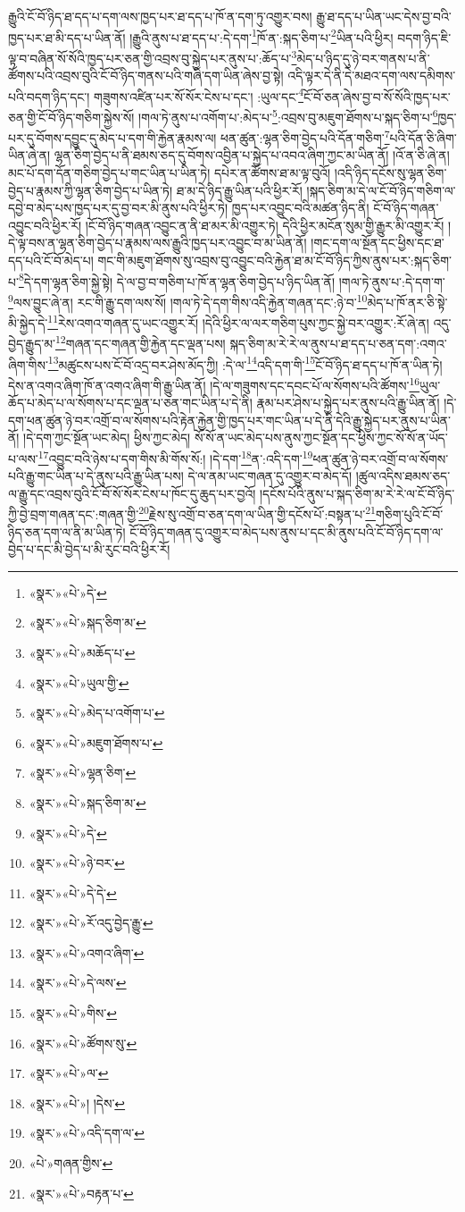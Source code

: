 རྒྱུའི་ངོ་བོ་ཉིད་ཐ་དད་པ་དག་ལས་ཁྱད་པར་ཐ་དད་པ་ཁོ་ན་དག་ཏུ་འགྱུར་བས། རྒྱུ་ཐ་དད་པ་ཡིན་ཡང་དེས་བྱ་བའི་ཁྱད་པར་ཐ་མི་དད་པ་ཡིན་ནོ། །རྒྱུའི་ནུས་པ་ཐ་དད་པ་:དེ་དག་\footnote{«སྣར་»«པེ་»དེ་}ཁོ་ན་:སྐད་ཅིག་པ་\footnote{«སྣར་»«པེ་»སྐད་ཅིག་མ་}ཡིན་པའི་ཕྱིར། བདག་ཉིད་ཇི་ལྟ་བ་བཞིན་སོ་སོའི་ཁྱད་པར་ཅན་གྱི་འབྲས་བུ་སྐྱེད་པར་ནུས་པ་:ཆོད་པ་\footnote{«སྣར་»«པེ་»མཆོད་པ་}མེད་པ་ཉིད་དུ་ཉེ་བར་གནས་པ་ནི་ཚོགས་པའི་འབྲས་བུའི་ངོ་བོ་ཉིད་གནས་པའི་གཞི་དག་ཡིན་ཞེས་བྱ་སྟེ། འདི་ལྟར་དེ་ནི་དེ་མཐའ་དག་ལས་དམིགས་པའི་བདག་ཉིད་དང་། གཟུགས་འཛིན་པར་སོ་སོར་ངེས་པ་དང་། :ཡུལ་དང་\footnote{«སྣར་»«པེ་»ཡུལ་གྱི་}ངོ་བོ་ཅན་ཞེས་བྱ་བ་སོ་སོའི་ཁྱད་པར་ཅན་གྱི་ངོ་བོ་ཉིད་གཅིག་སྐྱེས་སོ། །གལ་ཏེ་ནུས་པ་འགོག་པ་:མེད་པ་\footnote{«སྣར་»«པེ་»མེད་པ་འགོག་པ་}:འབྲས་བུ་མཇུག་ཐོགས་པ་སྐད་ཅིག་པ་\footnote{«སྣར་»«པེ་»མཇུག་ཐོགས་པ་}ཁྱད་པར་དུ་བོགས་དབྱུང་དུ་མེད་པ་དག་གི་རྐྱེན་རྣམས་ལ། ཕན་ཚུན་:ལྷན་ཅིག་བྱེད་པའི་དོན་གཅིག་\footnote{«སྣར་»«པེ་»ལྷན་ཅིག་}པའི་དོན་ཅི་ཞིག་ཡིན་ཞེ་ན། ལྷན་ཅིག་བྱེད་པ་ནི་ཐམས་ཅད་དུ་བོགས་འབྱིན་པ་སྐྱེད་པ་འབའ་ཞིག་ཀྱང་མ་ཡིན་ནོ། །འོ་ན་ཅི་ཞེ་ན། མང་པོ་དག་དོན་གཅིག་བྱེད་པ་གང་ཡིན་པ་ཡིན་ཏེ། དཔེར་ན་ཚོགས་ཐ་མ་ལྟ་བུའོ། །འདི་ཉིད་དངོས་སུ་ལྷན་ཅིག་བྱེད་པ་རྣམས་ཀྱི་ལྷན་ཅིག་བྱེད་པ་ཡིན་ཏེ། ཐ་མ་དེ་ཉིད་རྒྱུ་ཡིན་པའི་ཕྱིར་རོ། །སྐད་ཅིག་མ་དེ་ལ་ངོ་བོ་ཉིད་གཅིག་ལ་དབྱེ་བ་མེད་པས་ཁྱད་པར་དུ་བྱ་བར་མི་ནུས་པའི་ཕྱིར་ཏེ། ཁྱད་པར་འབྱུང་བའི་མཚན་ཉིད་ནི། ངོ་བོ་ཉིད་གཞན་འབྱུང་བའི་ཕྱིར་རོ། །ངོ་བོ་ཉིད་གཞན་འབྱུང་ན་ནི་ཐ་མར་མི་འགྱུར་ཏེ། དེའི་ཕྱིར་མངོན་སུམ་གྱི་རྒྱུར་མི་འགྱུར་རོ། །དེ་ལྟ་བས་ན་ལྷན་ཅིག་བྱེད་པ་རྣམས་ལས་རྒྱུའི་ཁྱད་པར་འབྱུང་བ་མ་ཡིན་ནོ། །གང་དག་ལ་སྔོན་དང་ཕྱིས་དང་ཐ་དད་པའི་ངོ་བོ་མེད་པ། གང་གི་མཇུག་ཐོགས་སུ་འབྲས་བུ་འབྱུང་བའི་རྐྱེན་ཐ་མ་ངོ་བོ་ཉིད་ཀྱིས་ནུས་པར་:སྐད་ཅིག་པ་\footnote{«སྣར་»«པེ་»སྐད་ཅིག་མ་}དེ་དག་ལྷན་ཅིག་སྐྱེ་སྟེ། དེ་ལ་བྱ་བ་གཅིག་པ་ཁོ་ན་ལྷན་ཅིག་བྱེད་པ་ཉིད་ཡིན་ནོ། །གལ་ཏེ་ནུས་པ་:དེ་དག་ག་\footnote{«སྣར་»«པེ་»དེ་}ལས་བྱུང་ཞེ་ན། རང་གི་རྒྱུ་དག་ལས་སོ། །གལ་ཏེ་དེ་དག་གིས་འདི་རྐྱེན་གཞན་དང་:ཉེ་བ་\footnote{«སྣར་»«པེ་»ཉེ་བར་}མེད་པ་ཁོ་ནར་ཅི་སྟེ་མི་སྐྱེད་དེ་\footnote{«སྣར་»«པེ་»དེ་དེ་}རེས་འགའ་གཞན་དུ་ཡང་འགྱུར་རོ། །དེའི་ཕྱིར་ལ་ལར་གཅིག་པུས་ཀྱང་སྐྱེ་བར་འགྱུར་:རོ་ཞེ་ན། འདུ་བྱེད་རྒྱུད་མ་\footnote{«སྣར་»«པེ་»རོ་འདུ་བྱེད་རྒྱུ་}གཞན་དང་གཞན་གྱི་རྐྱེན་དང་ལྡན་པས། སྐད་ཅིག་མ་རེ་རེ་ལ་ནུས་པ་ཐ་དད་པ་ཅན་དག་:འགའ་ཞིག་གིས་\footnote{«སྣར་»«པེ་»འགའ་ཞིག་}མཚུངས་པས་ངོ་བོ་འདྲ་བར་ཤེས་མོད་ཀྱི། :དེ་ལ་\footnote{«སྣར་»«པེ་»དེ་ལས་}འདི་དག་གི་\footnote{«སྣར་»«པེ་»གིས་}ངོ་བོ་ཉིད་ཐ་དད་པ་ཁོ་ན་ཡིན་ཏེ། དེས་ན་འགའ་ཞིག་ཁོ་ན་འགའ་ཞིག་གི་རྒྱུ་ཡིན་ནོ། །དེ་ལ་གཟུགས་དང་དབང་པོ་ལ་སོགས་པའི་ཚོགས་\footnote{«སྣར་»«པེ་»ཚོགས་སུ་}ཡུལ་ཆོད་པ་མེད་པ་ལ་སོགས་པ་དང་ལྡན་པ་ཅན་གང་ཡིན་པ་དེ་ནི། རྣམ་པར་ཤེས་པ་སྐྱེད་པར་ནུས་པའི་རྒྱུ་ཡིན་ནོ། །དེ་དག་ཕན་ཚུན་ཉེ་བར་འགྲོ་བ་ལ་སོགས་པའི་རྟེན་རྐྱེན་གྱི་ཁྱད་པར་གང་ཡིན་པ་དེ་ནི་དེའི་རྒྱུ་སྐྱེད་པར་ནུས་པ་ཡིན་ནོ། །དེ་དག་ཀྱང་སྔོན་ཡང་མེད། ཕྱིས་ཀྱང་མེད། སོ་སོ་ན་ཡང་མེད་པས་ནུས་ཀྱང་སྔོན་དང་ཕྱིས་ཀྱང་སོ་སོ་ན་ཡོད་པ་ལས་\footnote{«སྣར་»«པེ་»ལ་}འབྱུང་བའི་ཉེས་པ་དག་གིས་མི་གོས་སོ:། །དེ་དག་\footnote{«སྣར་»«པེ་»། །དེས་}ན་:འདི་དག་\footnote{«སྣར་»«པེ་»འདི་དག་ལ་}ཕན་ཚུན་ཉེ་བར་འགྲོ་བ་ལ་སོགས་པའི་རྒྱུ་གང་ཡིན་པ་དེ་ནུས་པའི་རྒྱུ་ཡིན་པས། དེ་ལ་ནམ་ཡང་གཞན་དུ་འགྱུར་བ་མེད་དོ། །ཚུལ་འདིས་ཐམས་ཅད་ལ་རྒྱུ་དང་འབྲས་བུའི་ངོ་བོ་སོ་སོར་ངེས་པ་ཁོང་དུ་ཆུད་པར་བྱའོ། །དངོས་པོའི་ནུས་པ་སྐད་ཅིག་མ་རེ་རེ་ལ་ངོ་བོ་ཉིད་ཀྱི་བྱེ་བྲག་གཞན་དང་:གཞན་གྱི་\footnote{«པེ་»གཞན་གྱིས་}རྗེས་སུ་འགྲོ་བ་ཅན་དག་ལ་ཡིན་གྱི་དངོས་པོ་:བསྟན་པ་\footnote{«སྣར་»«པེ་»བརྟན་པ་}གཅིག་པུའི་ངོ་བོ་ཉིད་ཅན་དག་ལ་ནི་མ་ཡིན་ཏེ། ངོ་བོ་ཉིད་གཞན་དུ་འགྱུར་བ་མེད་པས་ནུས་པ་དང་མི་ནུས་པའི་ངོ་བོ་ཉིད་དག་ལ་བྱེད་པ་དང་མི་བྱེད་པ་མི་རུང་བའི་ཕྱིར་རོ། 